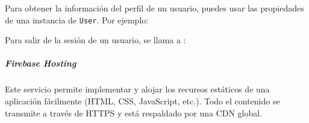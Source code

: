 Para obtener la información del perfil de un usuario, puedes usar las propiedades de una instancia de \texttt{User}. Por ejemplo:

%
\begin{sphinxVerbatim}[commandchars=\\\{\}]
   
     

    
    
    
    
    
                 

\end{sphinxVerbatim}


Para salir de la sesión de un usuario, se llama a :

%
\begin{sphinxVerbatim}[commandchars=\\\{\}]
 
     
 
     
\end{sphinxVerbatim}


\subparagraph{Firebase Hosting}
\label{\detokenize{firebase_web:firebase-hosting}}

Este servicio permite implementar y alojar los recursos estáticos de una aplicación
fácilmente (HTML, CSS, JavaScript, etc.). Todo el contenido se transmite a través
de HTTPS y está respaldado por una CDN global.

